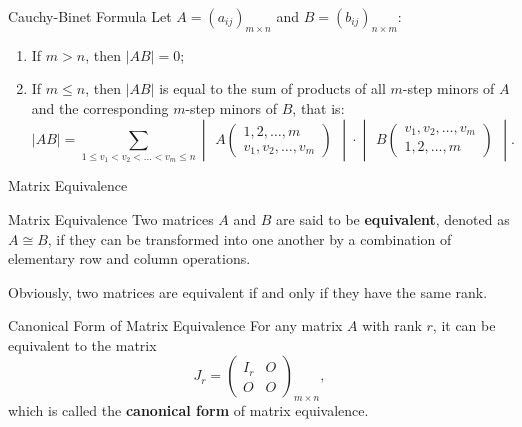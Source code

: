 \documentclass[11pt]{../../TexTemplate/elegantbook} %
\begin{document}
\begin{theorem}{Cauchy-Binet Formula}
    Let \( A = (a_{ij})_{m \times n} \) and \( B = (b_{ij})_{n \times m} \):  
    \begin{enumerate}
        \item If \( m > n \), then \( |AB| = 0 \);
        \item If \( m \leq n \), then \( |AB| \) is equal to 
        the sum of products of all \( m \)-step minors of \( A \) and 
        the corresponding \( m \)-step minors of \( B \), that is:
        \[
        |AB| = \sum_{1 \leq v_1 < v_2 < \dots < v_m \leq n} 
        \begin{vmatrix}
        A\begin{pmatrix}
        1, 2, \dots, m \\
        v_1, v_2, \dots, v_m
        \end{pmatrix}
        \end{vmatrix}
        \cdot 
        \begin{vmatrix}
        B\begin{pmatrix}
        v_1, v_2, \dots, v_m \\
        1, 2, \dots, m
        \end{pmatrix}
        \end{vmatrix}.
        \]
    \end{enumerate}
\end{theorem}




\begin{leftbarTitle}{Matrix Equivalence}\end{leftbarTitle}
\begin{definition}{Matrix Equivalence}
    Two matrices \( A \) and \( B \) are said to be \textbf{equivalent}, 
    denoted as \( A \cong B \),
    if they can be transformed into one another by a combination of elementary row and column operations.
\end{definition}

\begin{note}
    Obviously, two matrices are equivalent if and only if they have the same rank.
\end{note}

\begin{definition}{Canonical Form of Matrix Equivalence}
    For any matrix \( A \) with rank \( r \), 
    it can be equivalent to the matrix
    \[
    J_r = \begin{pmatrix}
    I_r & O \\
    O & O
    \end{pmatrix}_{m \times n},
    \]
    which is called the \textbf{canonical form} of matrix equivalence.
\end{definition}
\end{document}
